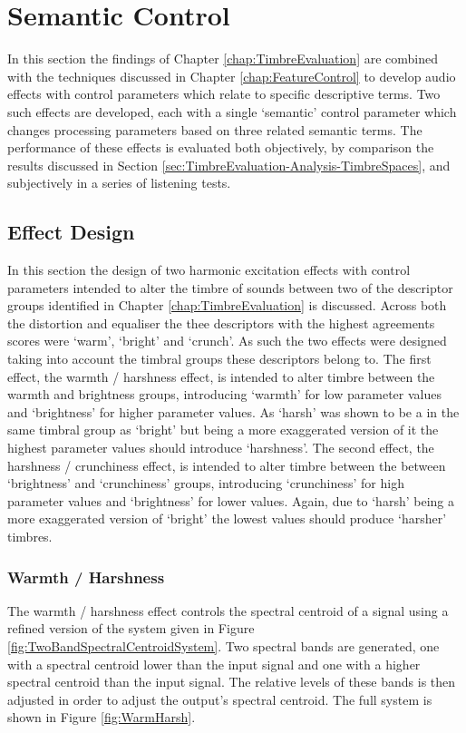 \section{Semantic Control}
\label{sec:PerceptualExperiments-SemanticControl}
	In this section the findings of Chapter \ref{chap:TimbreEvaluation} are combined with the techniques discussed in
	Chapter \ref{chap:FeatureControl} to develop audio effects with control parameters which relate to specific
	descriptive terms. Two such effects are developed, each with a single `semantic' control parameter which changes
	processing parameters based on three related semantic terms. The performance of these effects is evaluated both
	objectively, by comparison the results discussed in Section \ref{sec:TimbreEvaluation-Analysis-TimbreSpaces}, and
	subjectively in a series of listening tests.

	\subsection{Effect Design}
	\label{sec:PerceptualExperiments-SemanticControl-EffectDesign}
		In this section the design of two harmonic excitation effects with control parameters intended to alter the
		timbre of sounds between two of the descriptor groups identified in Chapter \ref{chap:TimbreEvaluation} is
		discussed. Across both the distortion and equaliser the thee descriptors with the highest agreements scores
		were `warm', `bright' and `crunch'. As such the two effects were designed taking into account the timbral
		groups these descriptors belong to. The first effect, the warmth / harshness effect, is intended to alter
		timbre between the warmth and brightness groups, introducing `warmth' for low parameter values and
		`brightness' for higher parameter values. As `harsh' was shown to be a in the same timbral group as
		`bright' but being a more exaggerated version of it the highest parameter values should introduce
		`harshness'. The second effect, the harshness / crunchiness effect, is intended to alter timbre between the
		between `brightness' and `crunchiness' groups, introducing `crunchiness' for high parameter values and
		`brightness' for lower values. Again, due to `harsh' being a more exaggerated version of `bright' the
		lowest values should produce `harsher' timbres.

		\subsubsection*{Warmth / Harshness}
			The warmth / harshness effect controls the spectral centroid of a signal using a refined version of
			the system given in Figure \ref{fig:TwoBandSpectralCentroidSystem}. Two spectral bands are
			generated, one with a spectral centroid lower than the input signal and one with a higher spectral
			centroid than the input signal. The relative levels of these bands is then adjusted in order to
			adjust the output's spectral centroid. The full system is shown in Figure \ref{fig:WarmHarsh}.

